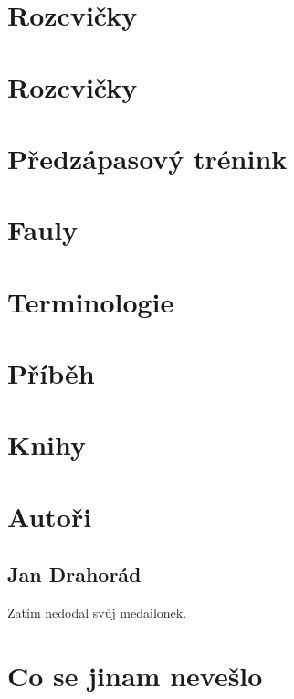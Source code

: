 \documentclass[a4paper,10pt,openany]{book}
\begin{document}
\chapter{Rozcvičky}\label{rozcvičky}



\chapter{Rozcvičky}\label{rozcvičky}





\chapter{Předzápasový trénink}\label{předzápasový trénink}


\chapter{Fauly}\label{fauly}



\chapter{Terminologie}\label{terminologie}
\label{:kategorie:terminologie}


\chapter{Příběh}\label{příběh}



\chapter{Knihy}\label{knihy}



\chapter{Autoři}\label{autori}
\section{Jan Drahorád}
Zatím nedodal svůj medailonek.



\chapter{Co se jinam nevešlo}\label{co se jinam nevešlo}

\end{document}
